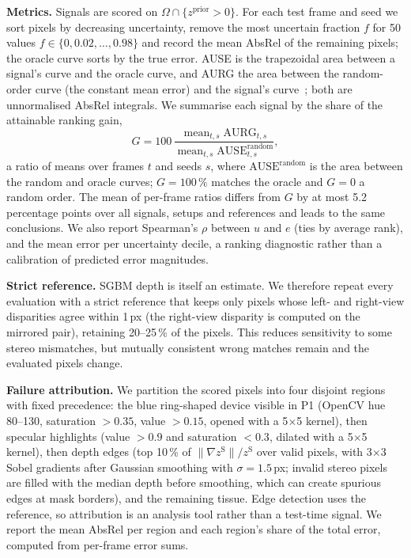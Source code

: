 \textbf{Metrics.} Signals are scored on $\Omega\cap\{z^{\mathrm{prior}}>0\}$. For each test frame and seed we sort pixels by decreasing uncertainty, remove the most uncertain fraction $f$ for 50 values $f\in\{0,0.02,\dots,0.98\}$ and record the mean AbsRel of the remaining pixels; the oracle curve sorts by the true error. AUSE is the trapezoidal area between a signal's curve and the oracle curve, and AURG the area between the random-order curve (the constant mean error) and the signal's curve~\cite{poggi2020uncertainty}; both are unnormalised AbsRel integrals. We summarise each signal by the share of the attainable ranking gain,
\begin{equation}
G=100\,\frac{\operatorname{mean}_{t,s}\mathrm{AURG}_{t,s}}{\operatorname{mean}_{t,s}\mathrm{AUSE}^{\mathrm{random}}_{t,s}},
\label{eq:gain}
\end{equation}
a ratio of means over frames $t$ and seeds $s$, where $\mathrm{AUSE}^{\mathrm{random}}$ is the area between the random and oracle curves; $G{=}100\,\%$ matches the oracle and $G{=}0$ a random order. The mean of per-frame ratios differs from $G$ by at most 5.2 percentage points over all signals, setups and references and leads to the same conclusions. We also report Spearman's $\rho$ between $u$ and $e$ (ties by average rank), and the mean error per uncertainty decile, a ranking diagnostic rather than a calibration of predicted error magnitudes.

\textbf{Strict reference.} SGBM depth is itself an estimate. We therefore repeat every evaluation with a strict reference that keeps only pixels whose left- and right-view disparities agree within 1\,px (the right-view disparity is computed on the mirrored pair), retaining 20--25\,\% of the pixels. This reduces sensitivity to some stereo mismatches, but mutually consistent wrong matches remain and the evaluated pixels change.

\textbf{Failure attribution.} We partition the scored pixels into four disjoint regions with fixed precedence: the blue ring-shaped device visible in P1 (OpenCV hue 80--130, saturation $>0.35$, value $>0.15$, opened with a 5$\times$5 kernel), then specular highlights (value $>0.9$ and saturation $<0.3$, dilated with a 5$\times$5 kernel), then depth edges (top 10\,\% of $\|\nabla z^{\mathrm{S}}\|/z^{\mathrm{S}}$ over valid pixels, with 3$\times$3 Sobel gradients after Gaussian smoothing with $\sigma{=}1.5$\,px; invalid stereo pixels are filled with the median depth before smoothing, which can create spurious edges at mask borders), and the remaining tissue. Edge detection uses the reference, so attribution is an analysis tool rather than a test-time signal. We report the mean AbsRel per region and each region's share of the total error, computed from per-frame error sums.
